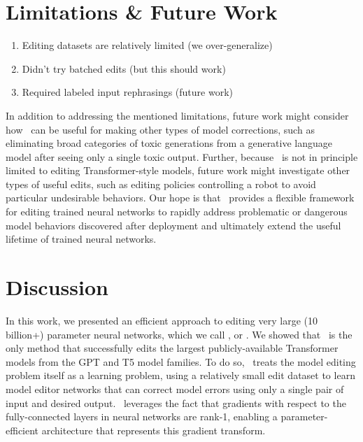 \documentclass{article}
\begin{document}


\section{Limitations \& Future Work}
\begin{enumerate}
    \item Editing datasets are relatively limited (we over-generalize)
    \item Didn't try batched edits (but this should work)
    \item Required labeled input rephrasings (future work)
\end{enumerate}
In addition to addressing the mentioned limitations, future work might consider how \name~can be useful for making other types of model corrections, such as eliminating broad categories of toxic generations from a generative language model after seeing only a single toxic output. Further, because \name~is not in principle limited to editing Transformer-style models, future work might investigate other types of useful edits, such as editing policies controlling a robot to avoid particular undesirable behaviors. Our hope is that \name~provides a flexible framework for editing trained neural networks to rapidly address problematic or dangerous model behaviors discovered after deployment and ultimately extend the useful lifetime of trained neural networks.
\section{Discussion}
In this work, we presented an efficient approach to editing very large (10 billion+) parameter neural networks, which we call \fullname, or \name. We showed that \name~is the only method that successfully edits the largest publicly-available Transformer models from the GPT and T5 model families. To do so, \name~treats the model editing problem itself as a learning problem, using a relatively small edit dataset to learn model editor networks that can correct model errors using only a single pair of input and desired output. \name~leverages the fact that gradients with respect to the fully-connected layers in neural networks are rank-1, enabling a parameter-efficient architecture that represents this gradient transform.



\newpage



\newpage

\appendix


\end{document}
